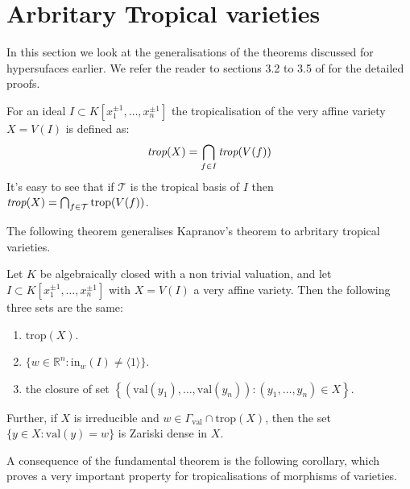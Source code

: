 \section{Arbritary Tropical varieties}

In this section we look at the generalisations of the theorems discussed for hypersufaces earlier. 
We refer the reader to sections 3.2 to 3.5 of \cite{maclagan2015introduction} for the detailed proofs.

\begin{definition}
    For an ideal $I \subset K[x_1^{\pm 1}, \dots, x_n^{\pm 1}]$ the tropicalisation of the very affine variety $X = V(I)$ is defined as:
    \[
        \emph{trop}(X) = \bigcap_{f \in I}\emph{trop}(V(f))
    \]
    It's easy to see that if $\mathcal{T}$ is the tropical basis of $I$ then $\emph{trop}(X) = \bigcap_{f \in \mathcal{T}}\text{trop}(V(f))$.
\end{definition}

The following theorem generalises Kapranov's theorem to arbritary tropical varieties.
    \begin{theorem}
        Let $K$ be algebraically closed with a non trivial valuation, and let $I \subset K[x_1^{\pm 1}, \dots, x_n^{\pm 1}]$ with $X = V(I)$ a very affine variety. 
        Then the following three sets are the same:
        \begin{enumerate}
            \item $\text{trop}(X)$.
            \item $\{w \in \mathbb{R}^{n}: \text{in}_{w}(I) \neq \langle 1\rangle\}$. 
            \item the closure of set $\left\{(\text{val}(y_1), \dots, \text{val}(y_n)): (y_1,\dots, y_n) \in X\right\}$.
        \end{enumerate}
        Further, if $X$ is irreducible and $w \in \Gamma_{\text{val}} \cap \text{trop}(X)$, then the set $\{y \in X: \text{val}(y) = w\}$ is Zariski dense in $X$.
    \end{theorem}

    A consequence of the fundamental theorem is the following corollary, which proves a very important property for tropicalisations of morphisms of varieties.
    
